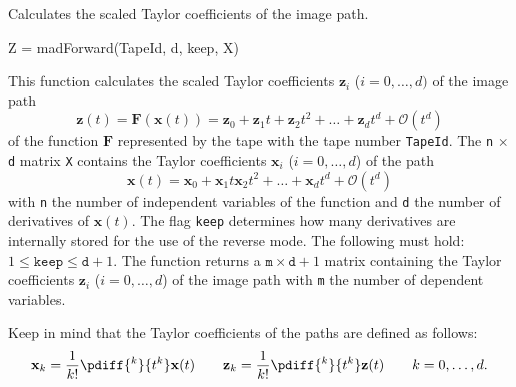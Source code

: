 



\begin{Purpose}
Calculates the scaled Taylor coefficients of the image path.
\end{Purpose}


\begin{Synopsis}
Z = madForward(TapeId, d, keep, X)
\end{Synopsis}


\begin{Description}
This function calculates the scaled Taylor coefficients $\mathbf{z}_i$ ($i=0,\ldots,d)$ of the image path 
\begin{equation*}
\mathbf{z}(t) = \mathbf{F}(\mathbf{x}(t)) = \mathbf{z}_0 + \mathbf{z}_1 t + \mathbf{z}_2 t^2 + \ldots + \mathbf{z}_d t^d + \mathcal{O}(t^d)
\end{equation*}
of the function $\mathbf{F}$ represented by the tape with the tape number \texttt{TapeId}. The \texttt{n} $\times$ \texttt{d} matrix \texttt{X} contains the Taylor coefficients $\mathbf{x}_i$ ($i=0,\ldots,d$) of the path 
\begin{equation*}
\mathbf{x}(t) = \mathbf{x}_0 + \mathbf{x}_1 t \mathbf{x}_2 t^2 + \ldots + \mathbf{x}_d t^d + \mathcal{O}(t^d)
\end{equation*}
with \texttt{n} the number of independent variables of the function and \texttt{d} the number of derivatives of $\mathbf{x}(t)$. The flag \texttt{keep} determines how many derivatives are internally stored for the use of the reverse mode. The following must hold: $1 \leq \mathtt{keep} \leq \mathtt{d}+1$. The function returns a $\mathtt{m} \times \mathtt{d}+1$ matrix containing the Taylor coefficients $\mathbf{z}_i$ ($i=0,\ldots,d$) of the image path with \texttt{m} the number of dependent variables.

Keep in mind that the Taylor coefficients of the paths are defined as follows:
\begin{equation*}
\mathbf{x}_k = \frac{1}{k!}\pdiff{^k}{t^k}\mathbf{x}(t) \qquad \mathbf{z}_k = \frac{1}{k!}\pdiff{^k}{t^k}\mathbf{z}(t) \qquad k = 0, \ldots, d.
\end{equation*}
\end{Description}


